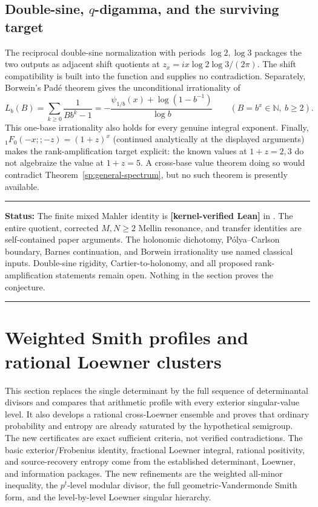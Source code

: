 \documentclass[11pt,oneside]{article}
\theoremstyle{definition}
\theoremstyle{remark}
\newcommand{\N}{\mathbb N}
\newcommand{\lean}[1]{\texttt{\detokenize{#1}}}
\newcommand{\statuslean}{\textcolor{leanblue}{\textbf{[kernel-verified Lean]}}}
\newenvironment{statusbox}[1]
{\begin{center}\begin{minipage}{0.94\textwidth}\raggedright\hbadness=10000\hrule
\vspace{0.45em}\textbf{Status:} #1\par\vspace{0.35em}}
{\vspace{0.35em}\hrule\end{minipage}\end{center}}
\begin{document}
\subsection{Double-sine, \texorpdfstring{$q$}{q}-digamma, and the surviving target}
\label{trf:qgamma}

The reciprocal double-sine normalization with periods $\log2,\log3$ packages the two outputs
as adjacent shift quotients at $z_x=i x\log2\log3/(2\pi)$.  The shift compatibility is built
into the function and supplies no contradiction.  Separately, Borwein's Pad\'e theorem gives
the unconditional irrationality of
\begin{equation}
 L_b(B)=\sum_{k\ge0}\frac1{Bb^k-1}
 =-\frac{\psi_{1/b}(x)+\log(1-b^{-1})}{\log b}
 \qquad(B=b^x\in\N,\ b\ge2).
 \label{trf:eq-qdigamma}
\end{equation}
This one-base irrationality \cite{Borwein1992} also holds for every genuine integral
exponent.  Finally,
${}_1F_0(-x;;-z)=(1+z)^x$ (continued analytically at the displayed arguments) makes the
rank-amplification target explicit: the known values at $1+z=2,3$ do not algebraize the value
at $1+z=5$.  A cross-base value theorem doing so would contradict
Theorem~\ref{sp:general-spectrum}, but no such theorem is presently available.

\begin{statusbox}{The finite mixed Mahler identity is \statuslean{} in
\lean{MixedMahlerFinite}.  The entire quotient, corrected
$M,N\ge2$ Mellin resonance, and transfer identities are self-contained paper arguments.  The
holonomic dichotomy, P\'olya--Carlson boundary, Barnes continuation, and Borwein irrationality
use named classical inputs.  Double-sine rigidity, Cartier-to-holonomy, and all proposed
rank-amplification statements remain open.  Nothing in the section proves the conjecture.}
\end{statusbox}

\section{Weighted Smith profiles and rational Loewner clusters}
\label{sec:weighted-smith-loewner}

This section replaces the single determinant by the full sequence of determinantal divisors
and compares that arithmetic profile with every exterior
singular-value level.  It also develops a rational cross-Loewner ensemble and proves that
ordinary probability and entropy are already saturated by the hypothetical semigroup.  The
new certificates are exact sufficient criteria, not verified contradictions.  The basic
exterior/Frobenius identity, fractional Loewner integral, rational positivity, and
source-recovery entropy come from the established determinant, Loewner, and information
packages.  The new refinements are the weighted all-minor inequality, the $p^t$-level modular divisor, the
full geometric-Vandermonde Smith form, and the level-by-level Loewner singular hierarchy.
\end{document}
